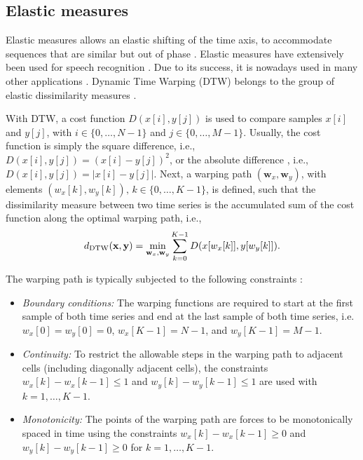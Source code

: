 \documentclass[10pt,final,a4paper,oneside,onecolumn]{article}
\newcommand{\ddtw}{d_{\textup{DTW}}}
\theoremstyle{plain}\newtheorem{definition}{Definition}[section]    %
\theoremstyle{definition}\newtheorem{example}{Example}[section]     %
\theoremstyle{remark}\newtheorem{remarkenv}{Remark}[section]        %
\begin{document}
\subsection{Elastic measures}
\label{sec:elastic measures}

Elastic measures allows an elastic shifting of the time axis, to accommodate sequences that are similar but out of phase \cite{keogh2005exactDTW}. Elastic measures have extensively been used for speech recognition \cite{rabiner1993speech, muller2007information}. Due to its success, it is nowadays used in many other applications \cite{serra2014empirical, wang2013distancemeasures}. Dynamic Time Warping (DTW) \cite{sakoe1978dynamic, berndt1994using} belongs to the group of elastic dissimilarity measures \cite{wang2013distancemeasures}.

With DTW, a cost function $D(x[i], y[j])$ is used to compare samples $x[i]$ and $y[j]$, with $i \in \{0, \ldots, N-1\}$ and $j \in \{0, \ldots, M-1\}$. Usually, the cost function is simply the square difference, i.e., $D(x[i], y[j]) = (x[i]-y[j])^2$, or the absolute difference \cite{berndt1994using}, i.e., $D(x[i], y[j])=|x[i] - y[j]|$. Next, a warping path $(\textbf{w}_x, \textbf{w}_y)$, with elements $(w_x[k], w_y[k]),\,k \in \{0, \ldots, K-1\}$, is defined, such that the dissimilarity measure between two time series is the accumulated sum of the cost function along the optimal warping path, i.e.,
\begin{equation} \label{eq:dtw cost}
	\ddtw(\textbf{x}, \textbf{y}) = \min_{\textbf{w}_x, \textbf{w}_y} \sum_{k=0}^{K-1} D(x[w_x[k]], y[w_y[k]]).
\end{equation}

The warping path is typically subjected to the following constraints \cite{keogh2005exactDTW}:
\begin{itemize}
	\item \emph{Boundary conditions:} The warping functions are required to start at the first sample of both time series and end at the last sample of both time series, i.e. $w_x[0]=w_y[0]=0$, $w_x[K-1]=N-1$, and $w_y[K-1]=M-1$. 
	\item \emph{Continuity:} To restrict the allowable steps in the warping path to adjacent cells (including diagonally adjacent cells), the constraints $w_x[k] - w_x[k-1] \leq 1$ and $w_y[k] - w_y[k-1] \leq 1$ are used with $k=1, \ldots, K-1$.
	\item \emph{Monotonicity:} The points of the warping path are forces to be monotonically spaced in time using the constraints $w_x[k] - w_x[k-1] \geq 0$ and $w_y[k] - w_y[k-1] \geq 0$ for $k=1, \ldots, K-1$. 
\end{itemize}
\end{document}
